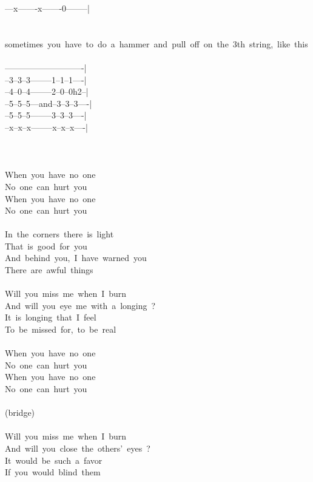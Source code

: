 {---x-------x-------0--------|\\
\\
\\
sometimes\ you\ have\ to\ do\ a\ hammer\ and\ pull\ off\ on\ the\ 3th\ string,\ like\ this\\
\\
----------------------------|\\
--3--3--3--------1--1--1----|\\
--4--0--4--------2--0--0h2--|\\
--5--5--5---and--3--3--3----|\\
--5--5--5--------3--3--3----|\\
--x--x--x--------x--x--x----|\\
\\
\\
\\
When\ you\ have\ no\ one\\
No\ one\ can\ hurt\ you\\
When\ you\ have\ no\ one\\
No\ one\ can\ hurt\ you\\
\\
In\ the\ corners\ there\ is\ light\\
That\ is\ good\ for\ you\\
And\ behind\ you,\ I\ have\ warned\ you\\
There\ are\ awful\ things\\
\\
Will\ you\ miss\ me\ when\ I\ burn\\
And\ will\ you\ eye\ me\ with\ a\ longing\ ?\\
It\ is\ longing\ that\ I\ feel\\
To\ be\ missed\ for,\ to\ be\ real\\
\\
When\ you\ have\ no\ one\\
No\ one\ can\ hurt\ you\\
When\ you\ have\ no\ one\\
No\ one\ can\ hurt\ you\\
\\
(bridge)\\
\\
Will\ you\ miss\ me\ when\ I\ burn\\
And\ will\ you\ close\ the\ others'\ eyes\ ?\\
It\ would\ be\ such\ a\ favor\\
If\ you\ would\ blind\ them\\
}
